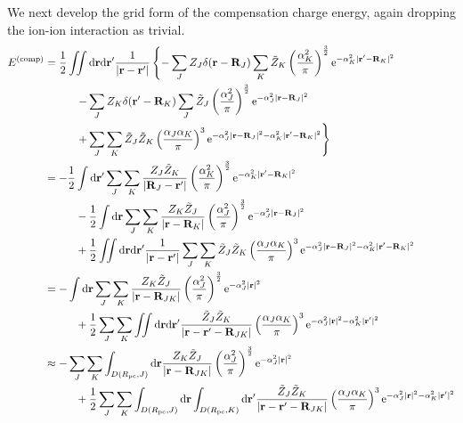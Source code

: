 \documentclass[paper=a4, fontsize=11pt]{article} %
\numberwithin{equation}{section} %
\numberwithin{figure}{section} %
\numberwithin{table}{section} %
\newcommand{\br}{{\bf{r}}}
\newcommand{\bR}{{\bf{R}}}
\newcommand{\re}{{\mathrm{e}}}
\newcommand{\rd}{{\mathrm{d}}}
\newcommand{\rcomp}{{\mathrm{comp}}}
\newcommand{\al}{{\alpha}}
\newcommand{\Rpc}{{R_{\mathrm{pc}}}}
\begin{document}
We next develop the grid form of the compensation charge energy, again dropping the ion-ion interaction as trivial.
\begin{equation}
\begin{split}
E^{(\rcomp)} 
&= \frac{1}{2}\iint \rd \br \rd \br' \frac{1}{|\br-\br'|} \left\{- \sum_J Z_J\delta(\br-\bR_J) \sum_K \tilde Z_K\left(\frac{\al_K^2}{\pi}\right)^{\frac{3}{2}}\re^{-\al_K^2|\br'-\bR_K|^2} \right. \\
&\left.\hspace{10mm} - \sum_J Z_K\delta(\br'-\bR_K) \sum_J \tilde Z_J\left(\frac{\al_J^2}{\pi}\right)^{\frac{3}{2}}\re^{-\al_J^2|\br-\bR_J|^2} \right. \\
&\left.\hspace{10mm} + \sum_J\sum_K \tilde Z_J\tilde Z_K\left(\frac{\al_J\al_K}{\pi}\right)^3\re^{-\al_J^2|\br-\bR_J|^2-\al_K^2|\br'-\bR_K|^2}\right\}\\
&= - \frac{1}{2}\int \rd \br' \sum_J\sum_K  \frac{Z_J\tilde Z_K}{|\bR_J-\br'|} \left(\frac{\al_K^2}{\pi}\right)^{\frac{3}{2}}\re^{-\al_K^2|\br'-\bR_K|^2}\\
&\hspace{10mm}- \frac{1}{2}\int \rd \br  \sum_J\sum_K  \frac{Z_K\tilde Z_J}{|\br - \bR_K|}\left(\frac{\al_J^2}{\pi}\right)^{\frac{3}{2}}\re^{-\al_J^2|\br-\bR_J|^2}\\
&\hspace{10mm}+ \frac{1}{2}\iint \rd \br \rd \br' \frac{1}{|\br-\br'|}\sum_J\sum_K \tilde Z_J\tilde Z_K\left(\frac{\al_J\al_K}{\pi}\right)^3\re^{-\al_J^2|\br-\bR_J|^2-\al_K^2|\br'-\bR_K|^2}\\
&= - \int \rd \br  \sum_J\sum_K  \frac{Z_K\tilde Z_J}{|\br - \bR_{JK}|}\left(\frac{\al_J^2}{\pi}\right)^{\frac{3}{2}}\re^{-\al_J^2|\br|^2}\\
&\hspace{10mm}+ \frac{1}{2}\sum_J\sum_K \iint \rd \br \rd \br' \frac{\tilde Z_J\tilde Z_K}{|\br-\br'-\bR_{JK}|}\left(\frac{\al_J\al_K}{\pi}\right)^3\re^{-\al_J^2|\br|^2-\al_K^2|\br'|^2}\\
&\approx - \sum_J\sum_K\int_{D(\Rpc,J)} \rd \br   \frac{Z_K\tilde Z_J}{|\br - \bR_{JK}|} \left(\frac{\al_J^2}{\pi}\right)^{\frac{3}{2}}\re^{-\al_J^2|\br|^2}\\
&\hspace{10mm}+ \frac{1}{2}\sum_J\sum_K\int_{D(\Rpc,J)} \rd \br \int_{D(\Rpc,K)}\rd \br'  \frac{\tilde Z_J\tilde Z_K}{|\br-\br'-\bR_{JK}|}\left(\frac{\al_J\al_K}{\pi}\right)^3\re^{-\al_J^2|\br|^2-\al_K^2|\br'|^2}\\

\end{split}
\end{equation}
\end{document}
